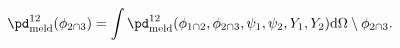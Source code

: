 \begin{equation}
  \pd_{\text{meld}}^{12}(\phi_{2 \cap 3}) = 
  \int
    \pd_{\text{meld}}^{12}(\phi_{1 \cap 2}, \phi_{2 \cap 3}, \psi_{1}, \psi_{2}, Y_{1}, Y_{2})
  \text{d}\Omega \setminus \phi_{2 \cap 3}.
  \label{eqn:strange-marginal-definition}
\end{equation}